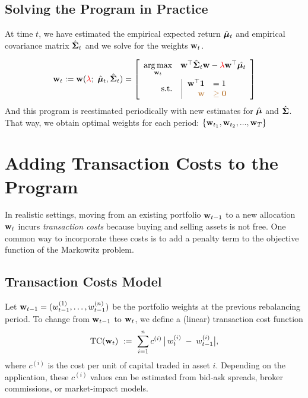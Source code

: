 \subsection{Solving the Program in Practice}
At time $t$, we have estimated the empirical expected return $\hat{\boldsymbol \mu}_t$ and empirical covariance matrix $\hat{\mathbf \Sigma}_t$ and we solve for the weights $\mathbf w_t$.

$$
\mbf w_t:=\mbf w(\red{\lambda};~\hat{\b \mu}_t, \hat{\mbf \Sigma}_t )
=
\2{\begin{array}{rl}
\underset{\mbf w_t}{\arg \max} & \mbf w \' \hat{\mbf \Sigma}_t  \mbf w - \red{\lambda} \mbf w\' \hat{\b\mu_t}
\\ [1em]
\t{s.t.} & 
	\left|
	\begin{array}{rl}
	\mbf w\'\mbf 1 &= 1
	\\
	\brown{\mbf w} & \brown{\geq \mbf 0}
	\end{array}
	\right.
\end{array}
}
$$
And this program is reestimated periodically with new estimates for $\hat{\boldsymbol \mu}$ and $\hat{\mathbf \Sigma}$. That way, we obtain optimal weights for each period: $\{\mathbf w_{t_1}, \mathbf w_{t_2},...,\mathbf w_{T}\}$


\section{Adding Transaction Costs to the Program}

In realistic settings, moving from an existing portfolio \(\mathbf w_{t-1}\) to a new allocation \(\mathbf w_t\) incurs \emph{transaction costs} because buying and selling assets is not free. One common way to incorporate these costs is to add a penalty term to the objective function of the Markowitz problem.

\subsection{Transaction Costs Model}
Let \(\mathbf w_{t-1} = (w_{t-1}^{(1)}, \dots, w_{t-1}^{(n)})\) be the portfolio weights at the previous rebalancing period. To change from \(\mathbf w_{t-1}\) to \(\mathbf w_t\), we define a (linear) transaction cost function
\[
\mathrm{TC}(\mathbf w_t) 
~:=~
\sum_{i=1}^n c^{(i)}\,\bigl|\, w_t^{(i)} \;-\; w_{t-1}^{(i)} \bigr|,
\]
where \(c^{(i)}\) is the cost per unit of capital traded in asset \(i\). Depending on the application, these \(c^{(i)}\) values can be estimated from bid-ask spreads, broker commissions, or market-impact models.

